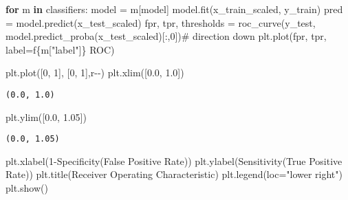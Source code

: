 \documentclass[
  letterpaper,
  DIV=11,
  numbers=noendperiod]{scrreprt}
\newenvironment{Shaded}{\begin{snugshade}}{\end{snugshade}}
\newcommand{\CommentTok}[1]{\textcolor[rgb]{0.37,0.37,0.37}{#1}}
\newcommand{\ControlFlowTok}[1]{\textcolor[rgb]{0.00,0.23,0.31}{\textbf{#1}}}
\newcommand{\DecValTok}[1]{\textcolor[rgb]{0.68,0.00,0.00}{#1}}
\newcommand{\FloatTok}[1]{\textcolor[rgb]{0.68,0.00,0.00}{#1}}
\newcommand{\KeywordTok}[1]{\textcolor[rgb]{0.00,0.23,0.31}{\textbf{#1}}}
\newcommand{\NormalTok}[1]{\textcolor[rgb]{0.00,0.23,0.31}{#1}}
\newcommand{\OperatorTok}[1]{\textcolor[rgb]{0.37,0.37,0.37}{#1}}
\newcommand{\SpecialCharTok}[1]{\textcolor[rgb]{0.37,0.37,0.37}{#1}}
\newcommand{\SpecialStringTok}[1]{\textcolor[rgb]{0.13,0.47,0.30}{#1}}
\newcommand{\StringTok}[1]{\textcolor[rgb]{0.13,0.47,0.30}{#1}}
\begin{document}
\begin{Shaded}
\begin{Highlighting}[]
\ControlFlowTok{for}\NormalTok{ m }\KeywordTok{in}\NormalTok{ classifiers:}
\NormalTok{    model }\OperatorTok{=}\NormalTok{ m[}\StringTok{\textquotesingle{}model\textquotesingle{}}\NormalTok{]}
\NormalTok{    model.fit(x\_train\_scaled, y\_train)}
\NormalTok{    pred }\OperatorTok{=}\NormalTok{ model.predict(x\_test\_scaled)}
\NormalTok{    fpr, tpr, thresholds }\OperatorTok{=}\NormalTok{ roc\_curve(y\_test, model.predict\_proba(x\_test\_scaled)[:,}\DecValTok{0}\NormalTok{])}\CommentTok{\# direction down }
\NormalTok{    plt.plot(fpr, tpr, label}\OperatorTok{=}\SpecialStringTok{f\textquotesingle{}}\SpecialCharTok{\{}\NormalTok{m[}\StringTok{"label"}\NormalTok{]}\SpecialCharTok{\}}\SpecialStringTok{ ROC\textquotesingle{}}\NormalTok{)}

\NormalTok{plt.plot([}\DecValTok{0}\NormalTok{, }\DecValTok{1}\NormalTok{], [}\DecValTok{0}\NormalTok{, }\DecValTok{1}\NormalTok{],}\StringTok{\textquotesingle{}r{-}{-}\textquotesingle{}}\NormalTok{)}
\NormalTok{plt.xlim([}\FloatTok{0.0}\NormalTok{, }\FloatTok{1.0}\NormalTok{])}
\end{Highlighting}
\end{Shaded}

\begin{verbatim}
(0.0, 1.0)
\end{verbatim}

\begin{Shaded}
\begin{Highlighting}[]
\NormalTok{plt.ylim([}\FloatTok{0.0}\NormalTok{, }\FloatTok{1.05}\NormalTok{])}
\end{Highlighting}
\end{Shaded}

\begin{verbatim}
(0.0, 1.05)
\end{verbatim}

\begin{Shaded}
\begin{Highlighting}[]
\NormalTok{plt.xlabel(}\StringTok{\textquotesingle{}1{-}Specificity(False Positive Rate)\textquotesingle{}}\NormalTok{)}
\NormalTok{plt.ylabel(}\StringTok{\textquotesingle{}Sensitivity(True Positive Rate)\textquotesingle{}}\NormalTok{)}
\NormalTok{plt.title(}\StringTok{\textquotesingle{}Receiver Operating Characteristic\textquotesingle{}}\NormalTok{)}
\NormalTok{plt.legend(loc}\OperatorTok{=}\StringTok{"lower right"}\NormalTok{)}
\NormalTok{plt.show()   }
\end{Highlighting}
\end{Shaded}
\end{document}
